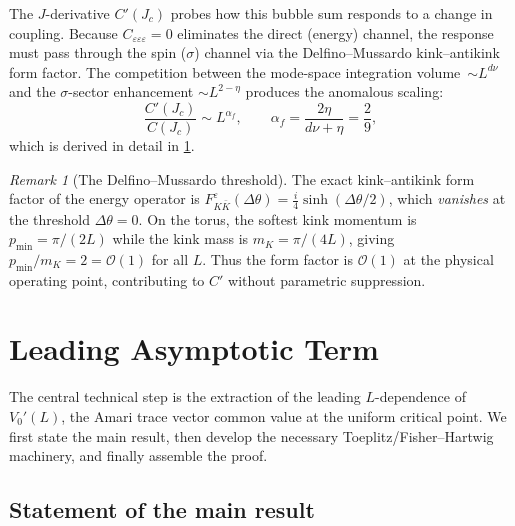\documentclass[11pt]{article}
\theoremstyle{definition}
\theoremstyle{remark}
\newtheorem{remark}[theorem]{Remark}
\newcommand{\Jc}{J_c}
\newcommand{\cO}{\mathcal{O}}
\begin{document}
The $J$-derivative $C'(\Jc)$ probes how this bubble sum responds to
a change in coupling. Because $C_{\varepsilon\varepsilon\varepsilon} = 0$
eliminates the direct (energy) channel, the response must pass through
the spin ($\sigma$) channel via the Delfino--Mussardo kink--antikink
form factor. The competition between the mode-space integration
volume~$\sim L^{d\nu}$ and the $\sigma$-sector enhancement
$\sim L^{2-\eta}$ produces the anomalous scaling:
\begin{equation}
  \frac{C'(\Jc)}{C(\Jc)} \sim L^{\alpha_f}, \qquad
  \alpha_f = \frac{2\eta}{d\nu + \eta} = \frac{2}{9},
  \label{eq:vertex-scaling}
\end{equation}
which is derived in detail in \cref{sec:leading}.

\begin{remark}[The Delfino--Mussardo threshold]
The exact kink--antikink form factor of the energy operator is
$F^\varepsilon_{K\bar{K}}(\Delta\theta) = \tfrac{i}{4}\sinh(\Delta\theta/2)$,
which \emph{vanishes} at the threshold $\Delta\theta = 0$. On the torus,
the softest kink momentum is $p_{\min} = \pi/(2L)$ while the kink mass
is $m_K = \pi/(4L)$, giving $p_{\min}/m_K = 2 = \cO(1)$ for all $L$.
Thus the form factor is $\cO(1)$ at the physical operating point,
contributing to $C'$ without parametric suppression.
\end{remark}


\section{Leading Asymptotic Term}
\label{sec:leading}

The central technical step is the extraction of the leading
$L$-dependence of $V_0'(L)$, the Amari trace vector common value
at the uniform critical point. We first state the main result, then
develop the necessary Toeplitz/Fisher--Hartwig machinery, and finally
assemble the proof.


\subsection{Statement of the main result}
\end{document}

